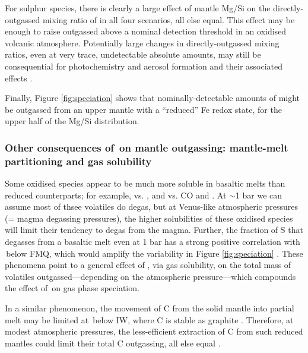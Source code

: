 For sulphur species, there is clearly a large effect of mantle Mg/Si on the directly-outgassed mixing ratio of  in all four scenarios, all else equal. This effect may be enough to raise outgassed  above a nominal detection threshold in an oxidised volcanic atmosphere. Potentially large changes in directly-outgassed  mixing ratios, even at very trace, undetectable absolute amounts, may still be consequential for photochemistry and aerosol formation and their associated effects \citep[e.g.,][]{loftus_sulfate_2019, jordan_photochemistry_2021}.

Finally, Figure \ref{fig:speciation} shows that nominally-detectable amounts of  might be outgassed from an upper mantle with a ``reduced'' Fe redox state, for the upper half of the Mg/Si distribution. 

\subsubsection{Other consequences of \fo\,on mantle outgassing: mantle-melt partitioning and gas solubility}


Some oxidised species appear to be much more soluble in basaltic melts than reduced counterparts; for example,  vs. , and  vs. CO and  \citep[and references therein]{gaillard_theoretical_2014}. At $\sim$1 bar we can assume most of thsee volatiles do degas, but at Venus-like atmospheric pressures (= magma degassing pressures), the higher solubilities of these oxidised species will limit their tendency to degas from the magma. Further, the fraction of S that degasses from a basaltic melt even at 1 bar has a strong positive correlation with \fo\,below FMQ, which would amplify the  variability in Figure \ref{fig:speciation} \citep[and references therein]{gaillard_redox_2015}. These phenomena point to a general effect of \fo, via gas solubility, on the total mass of volatiles outgassed---depending on the atmospheric pressure---which compounds the effect of \fo\,on gas phase speciation.

In a similar phenomenon, the movement of C from the solid mantle into partial melt may be limited at \fo\,below IW, where C is stable as graphite \citep{holloway_highpressure_1992, holloway_graphitemelt_1998, grott_volcanic_2011, wetzel_degassing_2013, armstrong_speciation_2015, li_carbon_2017}.  Therefore, at modest atmospheric pressures, the less-efficient extraction of C from such reduced mantles could limit their total C outgassing, all else equal \citep{guimond_low_2021}.



